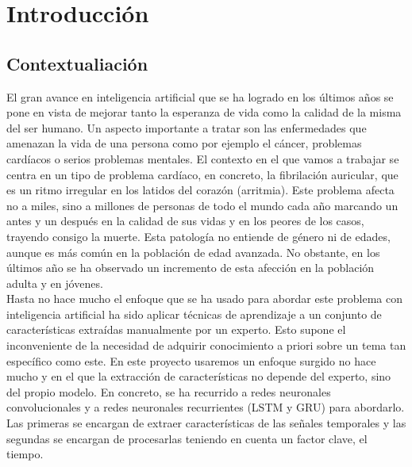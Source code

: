 
\setchapterpreamble[c][0.90\linewidth]{%
	\sffamily
  
	\par\bigskip
}

\chapter{Introducción}\label{ch:introducion}

    
    
\section{Contextualiación}

    El gran avance en inteligencia artificial que se ha logrado en los últimos años se pone en vista de mejorar tanto la esperanza de vida como la calidad de la misma del ser humano. Un aspecto importante a tratar son las enfermedades que amenazan la vida de una persona como por ejemplo el cáncer, problemas cardíacos o serios problemas mentales. El contexto en el que vamos a trabajar se centra en un tipo de problema cardíaco, en concreto, la fibrilación auricular, que es un ritmo irregular en los latidos del corazón (arritmia). Este problema afecta no a miles, sino a millones de personas de todo el mundo cada año marcando un antes y un después en la calidad de sus vidas y en los peores de los casos, trayendo consigo la muerte. Esta patología no entiende de género ni de edades, aunque es más común en la población de edad avanzada. No obstante, en los últimos año se ha observado un incremento de esta afección en la población adulta y en jóvenes. \\
    
    Hasta no hace mucho el enfoque que se ha usado para abordar este problema con inteligencia artificial ha sido aplicar técnicas de aprendizaje a un conjunto de características extraídas manualmente por un experto. Esto supone el inconveniente de la necesidad de adquirir conocimiento a priori sobre un tema tan específico como este. En este proyecto usaremos un enfoque surgido no hace mucho y en el que la extracción de características no depende del experto, sino del propio modelo. En concreto, se ha recurrido a redes neuronales convolucionales y a redes neuronales recurrientes (LSTM y GRU) para abordarlo. Las primeras se encargan de extraer características de las señales temporales y las segundas se encargan de procesarlas teniendo en cuenta un factor clave, el tiempo. \\
    
